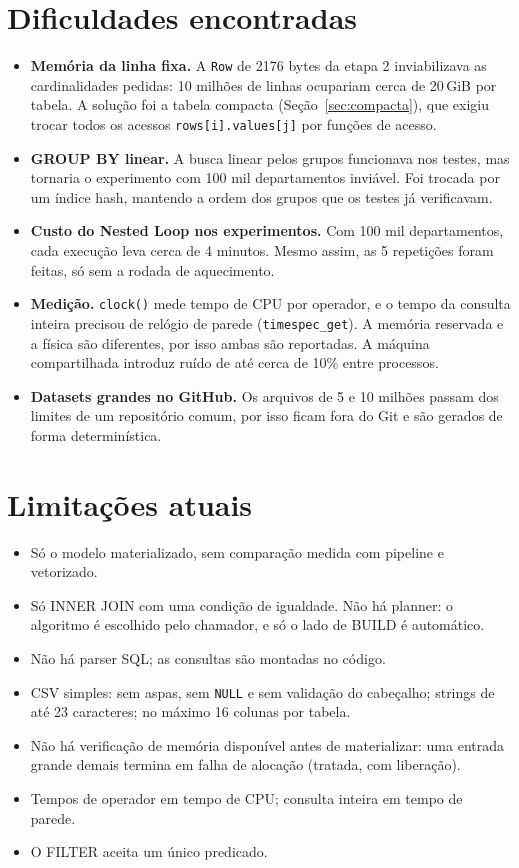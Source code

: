 \documentclass[11pt,a4paper]{article}
\begin{document}
\section{Dificuldades encontradas}\label{sec:dificuldades}
\begin{itemize}
    \item \textbf{Memória da linha fixa.} A \texttt{Row} de 2176 bytes da etapa 2 inviabilizava as cardinalidades pedidas: 10 milhões de linhas ocupariam cerca de 20\,GiB por tabela. A solução foi a tabela compacta (Seção~\ref{sec:compacta}), que exigiu trocar todos os acessos \texttt{rows[i].values[j]} por funções de acesso.
    \item \textbf{GROUP BY linear.} A busca linear pelos grupos funcionava nos testes, mas tornaria o experimento com 100 mil departamentos inviável. Foi trocada por um índice hash, mantendo a ordem dos grupos que os testes já verificavam.
    \item \textbf{Custo do Nested Loop nos experimentos.} Com 100 mil departamentos, cada execução leva cerca de 4 minutos. Mesmo assim, as 5 repetições foram feitas, só sem a rodada de aquecimento.
    \item \textbf{Medição.} \texttt{clock()} mede tempo de CPU por operador, e o tempo da consulta inteira precisou de relógio de parede (\texttt{timespec\_get}). A memória reservada e a física são diferentes, por isso ambas são reportadas. A máquina compartilhada introduz ruído de até cerca de 10\% entre processos.
    \item \textbf{Datasets grandes no GitHub.} Os arquivos de 5 e 10 milhões passam dos limites de um repositório comum, por isso ficam fora do Git e são gerados de forma determinística.
\end{itemize}

\section{Limitações atuais}\label{sec:limitacoes}
\begin{itemize}
    \item Só o modelo materializado, sem comparação medida com pipeline e vetorizado.
    \item Só INNER JOIN com uma condição de igualdade. Não há planner: o algoritmo é escolhido pelo chamador, e só o lado de BUILD é automático.
    \item Não há parser SQL; as consultas são montadas no código.
    \item CSV simples: sem aspas, sem \texttt{NULL} e sem validação do cabeçalho; strings de até 23 caracteres; no máximo 16 colunas por tabela.
    \item Não há verificação de memória disponível antes de materializar: uma entrada grande demais termina em falha de alocação (tratada, com liberação).
    \item Tempos de operador em tempo de CPU; consulta inteira em tempo de parede.
    \item O FILTER aceita um único predicado.
\end{itemize}
\end{document}
